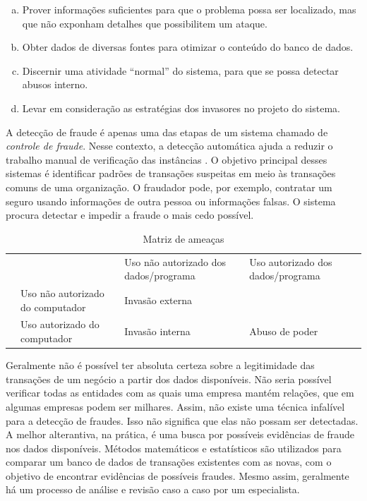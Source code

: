 \begin{enumerate}[a)]
    \item Prover informações suficientes para que o problema possa ser localizado, mas que não exponham detalhes que possibilitem um ataque.
    \item Obter dados de diversas fontes para otimizar o conteúdo do banco de dados.
    \item Discernir uma atividade ``normal'' do sistema, para que se possa detectar abusos interno.
    \item Levar em consideração as estratégias dos invasores no projeto do sistema.
\end{enumerate}

A detecção de fraude é apenas uma das etapas de um sistema chamado de \emph{controle de fraude}. Nesse contexto, a detecção automática ajuda a reduzir o trabalho manual de verificação das instâncias \cite{Phua2010}. O objetivo principal desses sistemas é identificar padrões de transações suspeitas em meio às transações comuns de uma organização. O fraudador pode, por exemplo, contratar um seguro usando informações de outra pessoa ou informações falsas. O sistema procura detectar e impedir a fraude o mais cedo possível.

\renewcommand{\arraystretch}{1.5}
\vspace{1cm}
\begin{table}[h!]
    \caption{Matriz de ameaças \cite{Anderson1972}}
    \centering
    \begin{tabular}{c p{4cm}|>{\centering\arraybackslash}p{4cm}|>{\centering\arraybackslash}p{4cm}|}
        \cline{3-4}
        & & Uso não autorizado dos dados/programa & Uso autorizado dos dados/programa \\
        \hhline{~---}
        \multicolumn{0}{c|}{} & Uso não autorizado do computador & Invasão externa & \cellcolor{gray!90} \\
        \cline{2-4}
        \multicolumn{0}{c|}{} & Uso autorizado do computador & Invasão interna & Abuso de poder \\
        \cline{2-4}
    \end{tabular}
    \label{fraud:and}
\end{table}
\vspace{1cm}

Geralmente não é possível ter absoluta certeza sobre a legitimidade das transações de um negócio a partir dos dados disponíveis. Não seria possível verificar todas as entidades com as quais uma empresa mantém relações, que em algumas empresas podem ser milhares. Assim, não existe uma técnica infalível para a detecção de fraudes. Isso não significa que elas não possam ser detectadas. A melhor alterantiva, na prática, é uma busca por possíveis evidências de fraude nos dados disponíveis. Métodos matemáticos e estatísticos são utilizados para comparar um banco de dados de transações existentes com as novas, com o objetivo de encontrar evidências de possíveis fraudes. Mesmo assim, geralmente há um processo de análise e revisão caso a caso por um especialista.

